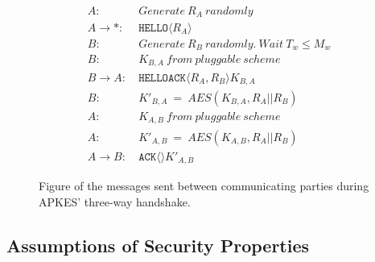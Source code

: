 \begin{figure}[h]
\begin{tcolorbox}[title=Three-way handshake in APKES]
\begin{align*}
A:\ & Generate\ R_A\ randomly\\
A \rightarrow *:\ & \texttt{HELLO}\langle{R_A}\rangle{}\\
B:\ & Generate\ R_B\ randomly.\ Wait\ T_w \leq M_w\\
B:\ & K_{B,A}\ from\ pluggable\ scheme\\
B \rightarrow A:\ & \texttt{HELLOACK}\langle{R_A, R_B}\rangle{K_{B,A}}\\
B:\ & K'_{B,A}\ =\ AES(K_{B,A}, R_A || R_B)\\
A:\ & K_{A,B}\ from\ pluggable\ scheme\\
A:\ & K'_{A,B}\ =\ AES(K_{A,B}, R_A || R_B)\\
A \rightarrow B:\ & \texttt{ACK}\langle{}\rangle{K'_{A,B}}
\end{align*}
\end{tcolorbox}
\caption{Figure of the messages sent between communicating parties during APKES' three-way handshake.}
\label{fig:apkes-handshake}
\end{figure}

\subsection{Assumptions of Security Properties}
\label{subsec:apkes-prop}

